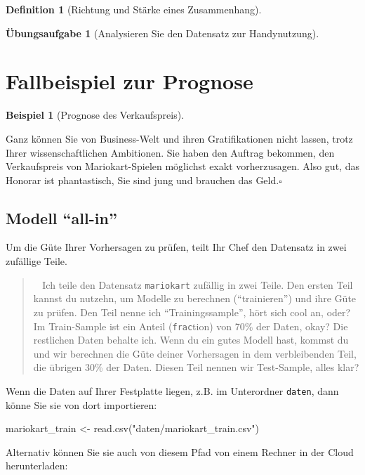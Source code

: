 \documentclass[
  a4paper,
  DIV=11]{scrreprt}
\newenvironment{Shaded}{\begin{snugshade}}{\end{snugshade}}
\newcommand{\FunctionTok}[1]{\textcolor[rgb]{0.28,0.35,0.67}{#1}}
\newcommand{\NormalTok}[1]{\textcolor[rgb]{0.00,0.23,0.31}{#1}}
\newcommand{\OtherTok}[1]{\textcolor[rgb]{0.00,0.23,0.31}{#1}}
\newcommand{\StringTok}[1]{\textcolor[rgb]{0.13,0.47,0.30}{#1}}
\theoremstyle{definition}
\newtheorem{exercise}{Übungsaufgabe}[chapter]
\theoremstyle{definition}
\newtheorem{example}{Beispiel}[chapter]
\theoremstyle{definition}
\newtheorem{definition}{Definition}[chapter]
\theoremstyle{remark}
\begin{document}
\begin{definition}[Richtung und Stärke eines
Zusammenhang]
\begin{exercise}[Analysieren Sie den Datensatz zur
Handynutzung]
\section{Fallbeispiel zur Prognose}\label{fallbeispiel-zur-prognose}

\begin{example}[Prognose des
Verkaufspreis]\protect\hypertarget{exm-prognose}{}\label{exm-prognose}

Ganz können Sie von Business-Welt und ihren Gratifikationen nicht
lassen, trotz Ihrer wissenschaftlichen Ambitionen. Sie haben den Auftrag
bekommen, den Verkaufspreis von Mariokart-Spielen möglichst exakt
vorherzusagen. Also gut, das Honorar ist phantastisch, Sie sind jung und
brauchen das Geld.\(\square\)

\end{example}

\subsection{Modell ``all-in''}\label{modell-all-in}

Um die Güte Ihrer Vorhersagen zu prüfen, teilt Ihr Chef den Datensatz in
zwei zufällige Teile.

\begin{quote}
🧔‍♂️ Ich teile den Datensatz \texttt{mariokart} zufällig in zwei Teile.
Den ersten Teil kannst du nutzehn, um Modelle zu berechnen
(``trainieren'') und ihre Güte zu prüfen. Den Teil nenne ich
``Trainingssample'', hört sich cool an, oder? Im Train-Sample ist ein
Anteil (\texttt{frac}tion) von 70\% der Daten, okay? Die restlichen
Daten behalte ich. Wenn du ein gutes Modell hast, kommst du und wir
berechnen die Güte deiner Vorhersagen in dem verbleibenden Teil, die
übrigen 30\% der Daten. Diesen Teil nennen wir Test-Sample, alles klar?
\end{quote}

Wenn die Daten auf Ihrer Festplatte liegen, z.B. im Unterordner
\texttt{daten}, dann könne Sie sie von dort importieren:

\begin{Shaded}
\begin{Highlighting}[]
\NormalTok{mariokart\_train }\OtherTok{\textless{}{-}} \FunctionTok{read.csv}\NormalTok{(}\StringTok{"daten/mariokart\_train.csv"}\NormalTok{)}
\end{Highlighting}
\end{Shaded}

Alternativ können Sie sie auch von diesem Pfad von einem Rechner in der
Cloud herunterladen:


\end{exercise}
\end{definition}
\end{document}
